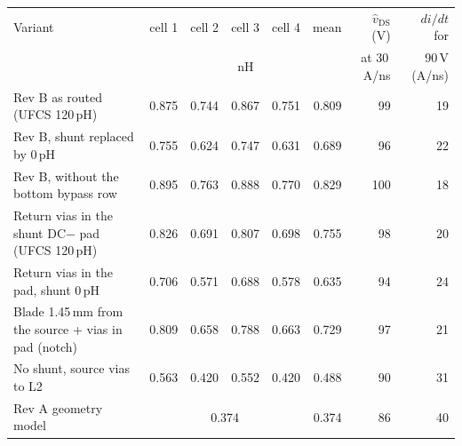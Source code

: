 \begin{tabular}{@{}lrrrrrrr@{}}
\toprule
Variant & cell 1 & cell 2 & cell 3 & cell 4 & mean & $\hat v_\mathrm{DS}$ (V) & $di/dt$ for \\
 & \multicolumn{5}{c}{nH} & at 30\,A/ns & 90\,V (A/ns) \\
\midrule
Rev B as routed (UFCS 120\,pH) & 0.875 & 0.744 & 0.867 & 0.751 & 0.809 & 99 & 19 \\
Rev B, shunt replaced by 0\,pH & 0.755 & 0.624 & 0.747 & 0.631 & 0.689 & 96 & 22 \\
Rev B, without the bottom bypass row & 0.895 & 0.763 & 0.888 & 0.770 & 0.829 & 100 & 18 \\
Return vias in the shunt DC$-$ pad (UFCS 120\,pH) & 0.826 & 0.691 & 0.807 & 0.698 & 0.755 & 98 & 20 \\
Return vias in the pad, shunt 0\,pH & 0.706 & 0.571 & 0.688 & 0.578 & 0.635 & 94 & 24 \\
Blade 1.45\,mm from the source + vias in pad (notch) & 0.809 & 0.658 & 0.788 & 0.663 & 0.729 & 97 & 21 \\
No shunt, source vias to L2 & 0.563 & 0.420 & 0.552 & 0.420 & 0.488 & 90 & 31 \\
\midrule
Rev A geometry model & \multicolumn{4}{c}{0.374} & 0.374 & 86 & 40 \\
\bottomrule
\end{tabular}

